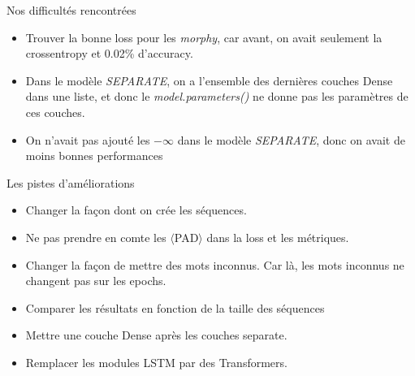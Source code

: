 \documentclass[11pt]{beamer}
\begin{document}
\begin{frame}{Nos difficultés rencontrées}
    \begin{itemize}
        \item Trouver la bonne loss pour les \textit{morphy}, car avant, on avait seulement 
            la crossentropy et 0.02\% d'accuracy.
        \item Dans le modèle \textit{SEPARATE}, on a l'ensemble des dernières couches 
            Dense dans une liste, et donc le \textit{model.parameters()} ne donne pas les 
            paramètres de ces couches.
        \item On n'avait pas ajouté les $-\infty$ dans le modèle \textit{SEPARATE},
            donc on avait de moins bonnes performances
    \end{itemize}
\end{frame}

\begin{frame}{Les pistes d'améliorations}
    \begin{itemize}
        \item Changer la façon dont on crée les séquences.
        \item Ne pas prendre en comte les $\langle$PAD$\rangle$ dans la loss et les métriques.
        \item Changer la façon de mettre des mots inconnus. Car là, les mots inconnus 
            ne changent pas sur les epochs.
        \item Comparer les résultats en fonction de la taille des séquences
        \item Mettre une couche Dense après les couches separate.
        \item Remplacer les modules LSTM par des Transformers.
    \end{itemize}
\end{frame}
\end{document}
